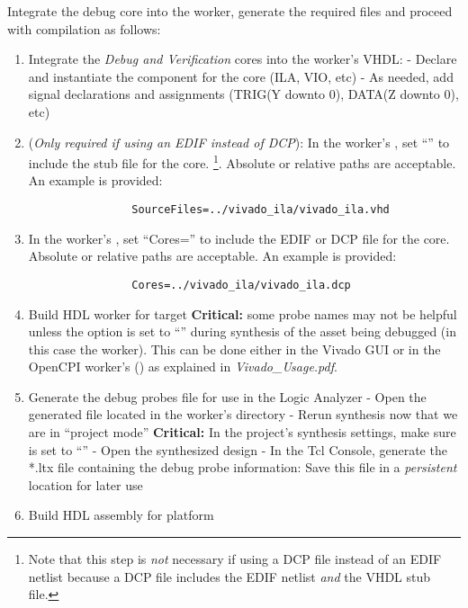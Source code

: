\begin{flushleft}
Integrate the debug core into the worker, generate the required files and proceed with compilation as follows:
		\begin{enumerate}
			\item Integrate the \textit{Debug and Verification} cores into the worker's VHDL:
				\subitem - Declare and instantiate the component for the core (ILA, VIO, etc)
				\subitem - As needed, add signal declarations and assignments (TRIG(Y downto 0), DATA(Z downto 0), etc)
			\item (\textit{Only required if using an EDIF instead of DCP}):
			In the worker's , set ``'' to include the stub file for the core.
			\footnote{Note that this step is \textit{not} necessary if using a DCP file instead of an EDIF netlist because a DCP file includes the EDIF netlist \textit{and} the VHDL stub file.}.
			Absolute or relative paths are acceptable. An example is provided:
			\small\begin{verbatim}
				SourceFiles=../vivado_ila/vivado_ila.vhd
			\end{verbatim}
		 	\item In the worker's , set ``Cores='' to include the EDIF or DCP file for the core.
			Absolute or relative paths are acceptable. An example is provided:
		 	\small\begin{verbatim}
		 		Cores=../vivado_ila/vivado_ila.dcp
		 	\end{verbatim}
		 	\item Build HDL worker for target
				\subitem \textbf{Critical:} some probe names may not be helpful unless the  option is set to ``'' during synthesis of the asset being debugged (in this case the worker). This can be done either in the Vivado GUI or in the OpenCPI worker's  () as explained in \textit{Vivado\_Usage.pdf}.
			\item Generate the debug probes file for use in the Logic Analyzer
				\subitem - Open the generated  file located in the worker's  directory
				\subitem - Rerun synthesis now that we are in ``project mode''
					\subsubitem \textbf{Critical:} In the project's synthesis settings, make sure  is set to ``''
				\subitem - Open the synthesized design
				\subitem - In the Tcl Console, generate the *.ltx file containing the debug probe information:
			 		\subsubitem {}
					\subsubitem * Save this file in a \textit{persistent} location for later use
			\item Build HDL assembly for platform
		\end{enumerate}


\end{flushleft}
